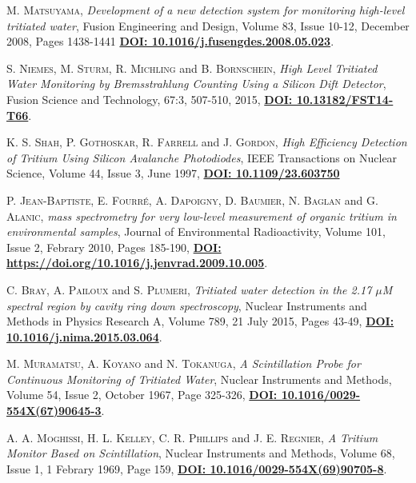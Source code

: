 \begin{thebibliography}{100}
 \textsc{M. Matsuyama},
\textit{Development of a new detection system for monitoring high-level tritiated water}, Fusion Engineering and Design, Volume 83, Issue 10-12, December 2008, Pages 1438-1441 \href{https://doi.org/10.1016/j.fusengdes.2008.05.023}{\textbf{DOI: 10.1016/j.fusengdes.2008.05.023}}.

 \textsc{S. Niemes}, \textsc{M. Sturm}, \textsc{R. Michling} and \textsc{B. Bornschein},
\textit{High Level Tritiated Water Monitoring by Bremsstrahlung Counting Using a Silicon Dift Detector}, Fusion Science and Technology, 67:3, 507-510, 2015, \href{https://doi.org/10.13182/FST14-T66}{\textbf{DOI: 10.13182/FST14-T66}}.

 \textsc{K. S. Shah}, \textsc{P. Gothoskar}, \textsc{R. Farrell} and \textsc{J. Gordon},
\textit{High Efficiency Detection of Tritium Using Silicon Avalanche Photodiodes}, IEEE Transactions on Nuclear Science, Volume 44, Issue 3, June 1997, \href{https://doi.org/10.1109/23.603750}{\textbf{DOI: 10.1109/23.603750}}

 \textsc{P. Jean-Baptiste}, \textsc{E. Fourré}, \textsc{A. Dapoigny}, \textsc{D. Baumier}, \textsc{N. Baglan} and \textsc{G. Alanic},
\textit{ mass spectrometry for very low-level measurement of organic tritium in environmental samples}, Journal of Environmental Radioactivity, Volume 101, Issue 2, Febrary 2010, Pages 185-190, \href{https://doi.org/10.1016/j.jenvrad.2009.10.005}{\textbf{DOI: https://doi.org/10.1016/j.jenvrad.2009.10.005}}. 

 \textsc{C. Bray}, \textsc{A. Pailoux} and \textsc{S. Plumeri},
\textit{Tritiated water detection in the 2.17 $\mu$M spectral region by cavity ring down spectroscopy},  Nuclear Instruments and Methods in Physics Research A, Volume 789, 21 July 2015, Pages 43-49, \href{https://doi.org/10.1016/j.nima.2015.03.064}{\textbf{DOI: 10.1016/j.nima.2015.03.064}}. 

 \textsc{M. Muramatsu}, \textsc{A. Koyano} and \textsc{N. Tokanuga},
\textit{A Scintillation Probe for Continuous Monitoring of Tritiated Water}, Nuclear Instruments and Methods, Volume 54, Issue 2, October 1967, Page 325-326, \href{https://doi.org/10.1016/0029-554X(67)90645-3}{\textbf{DOI: 10.1016/0029-554X(67)90645-3}}.

 \textsc{A. A. Moghissi}, \textsc{H. L. Kelley}, \textsc{C. R. Phillips} and \textsc{J. E. Regnier},
\textit{A Tritium Monitor Based on Scintillation}, Nuclear Instruments and Methods, Volume 68, Issue 1, 1 Febrary 1969, Page 159, \href{https://doi.org/10.1016/0029-554X(69)90705-8}{\textbf{DOI: 10.1016/0029-554X(69)90705-8}}.


\end{thebibliography}
